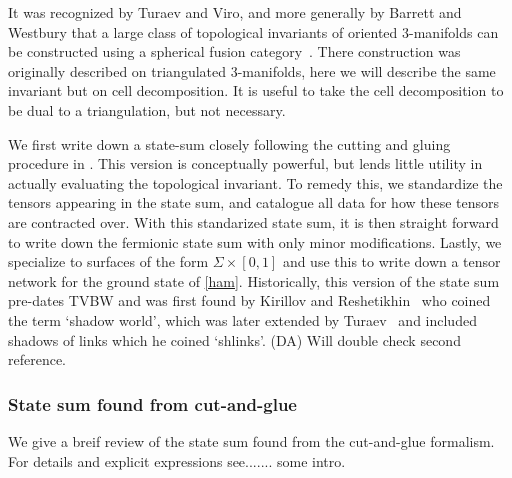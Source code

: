 \documentclass[12pt,a4paper]{article}
\newcommand{\dave}[1]{{\color{ao(english)}\footnotesize{(DA) #1}}}
\begin{document}
It was recognized by Turaev and Viro, and more generally by Barrett and Westbury that a large class of topological invariants of oriented 3-manifolds
can be constructed using a spherical fusion category~\cite{Turaev1992,Barrett1996}.
There construction was originally described on triangulated 3-manifolds, 
here we will describe the same invariant but on cell decomposition.
It is useful to take the cell decomposition to be dual to a triangulation, 
but not necessary. 

We first write down a state-sum closely following the cutting and gluing procedure in \cite{Walker2006}. 
This version is conceptually powerful, 
but lends little utility in actually evaluating the topological invariant. 
To remedy this, we standardize the tensors appearing in the state sum, 
and catalogue all data for how these tensors are contracted over.
With this standarized state sum, 
it is then straight forward to write down the fermionic state sum with only minor modifications. 
Lastly, we specialize to surfaces of the form $\Sigma \times [0,1]$ 
and use this to write down a tensor network for the ground state of \eqref{ham}. 
Historically, this version of the state sum pre-dates TVBW and was first found by Kirillov and Reshetikhin~\cite{Kirillow1989} who coined the term `shadow world', which was later extended by Turaev~\cite{turaev1992shadow} and included shadows of links which he coined `shlinks'.
\dave{Will double check second reference.}


\subsubsection{State sum found from cut-and-glue}
We give a breif review of the state sum found from the cut-and-glue formalism. 
For details and explicit expressions see....... some intro.
\end{document}
